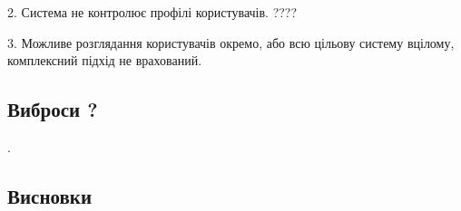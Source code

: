 	2. Система не контролює профілі користувачів. ???? %

	3. Можливе розглядання користувачів окремо, або всю цільову систему вцілому, комплексний підхід не врахований. \TBD

\subsection{Виброси ? \TBD}
    \TBD \cite{ben2005outlier}.


\newpage
\subsection*{Висновки}
    \TBD
